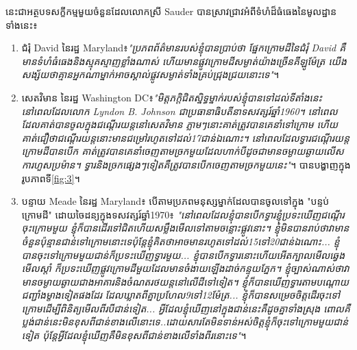\documentclass[10pt,twocolumn,letterpaper]{article}
\begin{document}
	នេះជាអត្ថបទសក្ខីកម្មមួយចំនួនដែលលោកស្រី Sauder បានស្រាវជ្រាវ​អំពីទំហំដ៏ធំធេងនៃមូលដ្ឋានទាំងនេះ៖
\begin{flushleft}
\begin{enumerate}
    \item ជំរុំ David នៃរដ្ឋ Maryland៖\textit{"ប្រភពព័ត៌មានរបស់ខ្ញុំបានប្រាប់ថា ផ្នែកក្រោមដីនៃជំរុំ David គឺមានទំហំធំធេងនិងស្មុគស្មាញខ្លាំងណាស់ ហើយមានផ្លូវក្រោមដីសម្ងាត់យ៉ាងច្រើនគីឡូម៉ែត្រ យើងសង្ស័យថាគ្មានអ្នកណាម្នាក់អាចស្គាល់ផ្លូវសម្ងាត់ទាំងគ្រប់ជ្រុងជ្រយនោះទេ"}\cite{22}។
    \item សេតវិមាន នៃរដ្ឋ Washington DC៖\textit{"មិត្តភក្តិជិតស្និទ្ធម្នាក់របស់ខ្ញុំបានទៅដល់ទីតាំងនេះនៅពេលដែលលោក Lyndon B. Johnson ជាប្រធានាធិបតីនាទសវត្សរ៍ឆ្នាំ1960។ នៅពេលដែលគាត់បានចូលក្នុងជណ្តើរយន្តនៅសេតវិមាន ភ្លាមៗនោះគាត់ត្រូវបានគេនាំទៅក្រោម ហើយគាត់ជឿថាជណ្តើរយន្តនោះមានជម្រៅរហូតទៅដល់17ជាន់ឯណោះ។ នៅពេលដែលទ្វារជណ្តើរយន្តក្រោមដីបានបើក  គាត់ត្រូវបានគេនាំចេញតាមច្រកមួយដែលហាក់បីដូចជាមានចម្ងាយឆ្ងាយលើសការហួសប្រម៉ាន។ ទ្វារនិងច្រកផ្សេងៗទៀតគឺត្រូវបានបើកចេញតាមច្រកមួយនេះ"}\cite{22}។ បានបង្ហាញក្នុងរូបភាពទី\ref{fig:3}។
   \item បន្ទាយ Meade នៃរដ្ឋ Maryland៖ បើតាមប្រភពមនុស្សម្នាក់ដែលបានចូលទៅក្នុង "បន្ទប់ក្រោមដី" ដោយចៃដន្យក្នុងទសវត្សរ៍ឆ្នាំ1970៖ \textit{"នៅពេលដែលខ្ញុំបានបើកទ្វារខ្ញុំប្រទះឃើញជណ្តើរចុះក្រោមមួយ ខ្ញុំក៏បានដើរទៅជិតហើយសម្លឹងមើលទៅតាមចន្លោះផ្លូវនោះ។ ខ្ញុំមិនបានរាប់ថាវាមានចំនួនប៉ុន្មានជាន់ទៅក្រោមនោះទេ​ ប៉ុន្តែខ្ញុំគិតថាអាចមានរហូតទៅដល់15ទៅ20ជាន់ឯណោះ... ខ្ញុំបានចុះទៅក្រោមមួយជាន់ក៏ប្រទះឃើញទ្វារមួយ... ខ្ញុំបានបើកទ្វារនោះហើយអើតក្បាលមើលឆ្វេងមើលស្តាំ ក៏ប្រទះឃើញផ្លូវក្រោមដីមួយដែលមានចំងាយឡើងដាច់កន្ទុយភ្នែក។ ខ្ញុំច្បាស់ណាស់ថាវាមានចម្ងាយឆ្ងាយជាងអាគារនិងចំណតរថយន្តនៅលើដីទៅទៀត។ ខ្ញុំក៏បានឃើញទ្វារតាមបណ្តោយជញ្ជាំងម្ខាងទៀតផងដែរ ដែលឃ្លាតពីគ្នាប្រហែល9ទៅ12ម៉ែត្រ... ខ្ញុំក៏បានសម្រេចចិត្តដើរចុះទៅក្រោមដើម្បីពិនិត្យមើលពីរបីជាន់ទៀត... អ្វីដែលខ្ញុំឃើញនៅក្នុងជាន់នេះគឺដូចគ្នាទាំងស្រុង ពោលគឺប្លង់ជាន់នេះមិនខុសពីជាន់ខាងលើនោះទេ..ដោយសារតែមិនទាន់អស់ចិត្តខ្ញុំក៏ចុះទៅក្រោមមួយជាន់ទៀត ប៉ុន្តែអ្វីដែលខ្ញុំឃើញគឺមិនខុសពីជាន់ខាងលើទាំងពីរនោះទេ"}\cite{22}។
\end{enumerate}
\end{flushleft}
\end{document}

